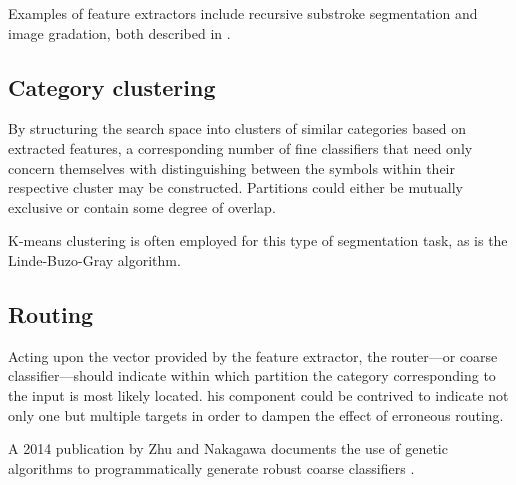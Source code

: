 \documentclass[10pt,conference,a4paper]{IEEEtran}
\begin{document}
	Examples of feature extractors include recursive substroke segmentation and image gradation, both described in \cite{tanaka1999hybrid}.



	\subsection{Category clustering}

	By structuring the search space into clusters of similar \mbox{categories} based on extracted features,
	a corresponding number of fine classifiers that need only concern themselves with distinguishing
	between the symbols within their respective cluster may be constructed.
	Partitions could either be mutually exclusive or contain some degree of overlap.

	K-means clustering is often employed for this type of segmentation task, as is the Linde-Buzo-Gray algorithm.%

	


	\subsection{Routing}

	Acting upon the vector provided by the feature extractor, the router---or coarse classifier---should indicate
	within which partition the category corresponding to the input is most likely located. his component could
	be contrived to indicate not only one but multiple targets in order to dampen the effect of erroneous routing.

	A 2014 publication by Zhu and Nakagawa documents the use of genetic algorithms to programmatically generate robust coarse classifiers \cite{zhu2014robust}.
\end{document}
